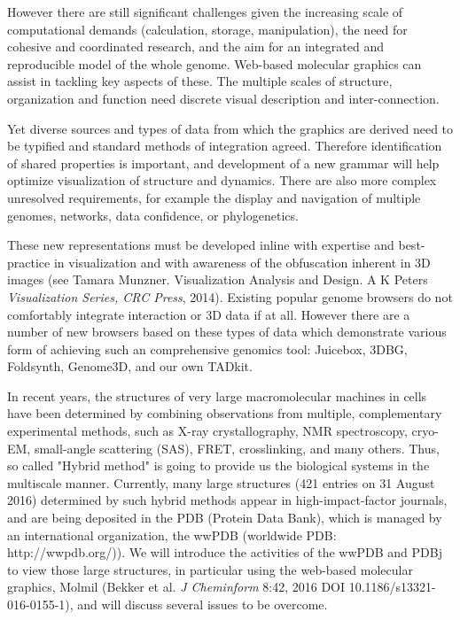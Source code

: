 \documentclass[a4paper]{article}
\begin{document}
However there are still significant challenges given the increasing scale of computational demands (calculation, storage, manipulation), the need for cohesive and coordinated research, and the aim for an integrated and reproducible model of the whole genome. Web-based molecular graphics can assist in tackling key aspects of these. The multiple scales of structure, organization and function need discrete visual description and inter-connection.

Yet diverse sources and types of data from which the graphics are derived need to be typified and standard methods of integration agreed. Therefore identification of shared properties is important, and development of a new grammar will help optimize visualization of structure and dynamics. There are also more complex unresolved requirements, for example the display and navigation of multiple genomes, networks, data confidence, or phylogenetics.

These new representations must be developed inline with expertise and best-practice in visualization and with awareness of the obfuscation inherent in 3D images (see Tamara Munzner. Visualization Analysis and Design. A K Peters \emph{Visualization Series, CRC Press}, 2014). Existing popular genome browsers do not comfortably integrate interaction or 3D data if at all. However there are a number of new browsers based on these types of data which demonstrate various form of achieving such an comprehensive genomics tool: Juicebox, 3DBG, Foldsynth, Genome3D, and our own TADkit.


In recent years, the structures of very large macromolecular machines in cells have been determined by combining observations from multiple, complementary experimental methods, such as X-ray crystallography, NMR spectroscopy, cryo-EM, small-angle scattering (SAS), FRET, crosslinking, and many others. Thus, so called "Hybrid method" is going to provide us the biological systems in the multiscale manner. Currently, many large structures (421 entries on 31 August 2016) determined by such hybrid methods appear in high-impact-factor journals, and are being deposited in the PDB (Protein Data Bank), which is managed by an international organization, the wwPDB (worldwide PDB: http://wwpdb.org/)). We will introduce the activities of the wwPDB and PDBj to view those large structures, in particular using the web-based molecular graphics, Molmil (Bekker et al. \emph{J Cheminform} 8:42, 2016 DOI 10.1186/s13321-016-0155-1), and will discuss several issues to be overcome. 
\end{document}
